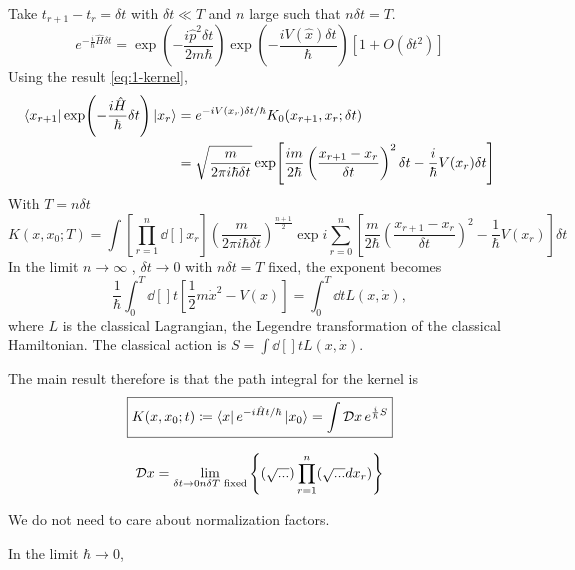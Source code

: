 Take $t_{r+1} -t_r = \delta t$  with $\delta t \ll T$  and $n$ large such that $n \delta t = T$.
 \begin{equation}
   e^{-\frac{i}{\hbar} \hat{H} \delta t} = \exp(-\frac{i \hat{p}^2 \delta t}{2 m \hbar}) \exp(-\frac{i V(\hat{x}) \delta t}{\hbar}) [1 + O(\delta t^2)]
\end{equation}
Using the result \eqref{eq:1-kernel}, 
\begin{align}
  \bra{x_{r +1}} \exp(- \frac{i \hat{H}}{\hbar} \delta t)\ket{x_r} &= e^{-i V(x_r) \delta t / \hbar} K_0 (x_{r+1}, x_r ; \delta t) \\
  &= \sqrt{\frac{m}{2 \pi i \hbar \delta t}} \exp[\frac{i m}{2 \hbar} \left( \frac{x_{r+1} - x_r}{\delta t} \right)^2 \delta t - \frac{i}{\hbar} V(x_r) \delta t]
\end{align}
With $T = n \delta t$
 \begin{equation}
   K(x, x_0; T) = \int \left[ \prod_{r = 1}^n \dd[]{x_r} \right] \left( \frac{m}{2 \pi i \hbar \delta t} \right)^{\frac{n + 1}{2}} \exp{i \sum_{r = 0}^n \left[ \frac{m}{2 \hbar}\left( \frac{x_{r + 1} - x_r}{\delta t} \right)^2 - \frac{1}{\hbar} V(x_r) \right] \delta t}
\end{equation}
In the limit $n \to \infty$ , $\delta t \to 0$ with  $n \delta t = T$  fixed, the exponent becomes
\begin{equation}
  \frac{1}{\hbar}\int_0^T \dd[]{t} \left[ \frac{1}{2} m \dot{x}^2 - V(x) \right] = \int_0^T \dd{t} L(x, \dot{x}),
\end{equation}
where $L$  is the classical Lagrangian, the Legendre transformation of the classical Hamiltonian.
The classical action is $S = \int \dd[]{t} L(x, \dot{x})$.

The main result therefore is that the path integral for the kernel is
\begin{equation}
  \boxed{K(x, x_0; t) \coloneqq \bra{x}e^{-i \hat{H} t / \hbar} \ket{x_0} = \int \mathop{\mathcal{D} x} e^{\frac{i}{\hbar} S}}
\end{equation}

\begin{definition}
  \begin{equation}
    \mathop{\mathcal{D} x} = \lim_{\delta t \to 0 \\ n \delta T \text{ fixed}} \left\{ (\sqrt{...}) \prod_{r = 1}^n (\sqrt{...} d x_r) \right\}
  \end{equation}
\end{definition}
We do not need to care about normalization factors.

\begin{remark}
  In the limit $\hbar \to 0$, 
\end{remark}
